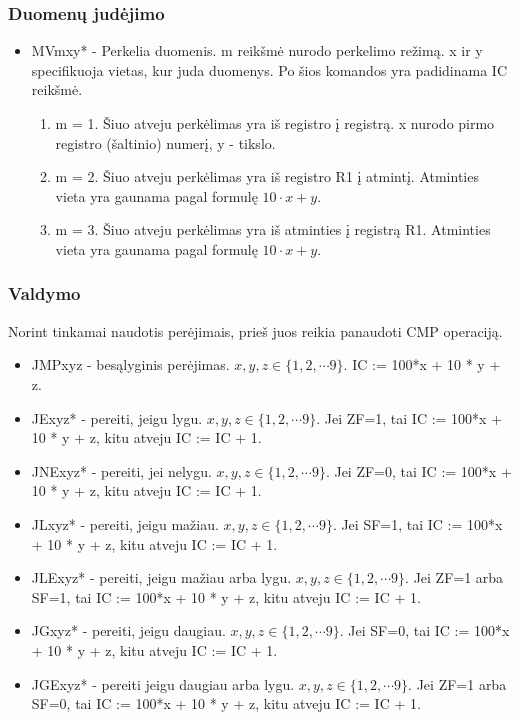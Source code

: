 \documentclass{VUMIFInfKursinis}
\begin{document}
\subsubsection{Duomenų judėjimo}
\begin{itemize}
	\item MVmxy* - Perkelia duomenis. m reikšmė nurodo perkelimo režimą. x ir y specifikuoja vietas, kur juda duomenys. Po šios komandos yra padidinama IC reikšmė.
	\begin{enumerate}
		\item m = 1. Šiuo atveju perkėlimas yra iš registro į registrą. x nurodo pirmo registro (šaltinio) numerį, y - tikslo.
		\item m = 2. Šiuo atveju perkėlimas yra iš registro R1 į atmintį. Atminties vieta yra gaunama pagal formulę $10 \cdot x + y$.
		\item m = 3. Šiuo atveju perkėlimas yra iš atminties į registrą R1. Atminties vieta yra gaunama pagal formulę $10 \cdot x + y$.
	\end{enumerate}
\end{itemize}

\subsubsection{Valdymo}
Norint tinkamai naudotis perėjimais, prieš juos reikia panaudoti CMP operaciją. 
\begin{itemize}
	\item JMPxyz - besąlyginis perėjimas. $x, y, z \in \{1, 2, \cdots 9 \}$. IC := 100*x + 10 * y + z.
	\item JExyz* - pereiti, jeigu lygu. $x, y, z \in \{1, 2, \cdots 9 \}$. Jei ZF=1, tai IC := 100*x + 10 * y + z, kitu atveju IC := IC + 1.
	\item JNExyz* - pereiti, jei nelygu. $x, y, z \in \{1, 2, \cdots 9 \}$. Jei ZF=0, tai IC := 100*x + 10 * y + z, kitu atveju IC := IC + 1.
	\item JLxyz* - pereiti, jeigu mažiau. $x, y, z \in \{1, 2, \cdots 9 \}$. Jei SF=1, tai IC := 100*x + 10 * y + z, kitu atveju IC := IC + 1.
	\item JLExyz* - pereiti, jeigu mažiau arba lygu. $x, y, z \in \{1, 2, \cdots 9 \}$. Jei ZF=1 arba SF=1, tai IC := 100*x + 10 * y + z, kitu atveju IC := IC + 1.
	\item JGxyz* - pereiti, jeigu daugiau. $x, y, z \in \{1, 2, \cdots 9 \}$. Jei SF=0, tai IC := 100*x + 10 * y + z, kitu atveju IC := IC + 1.
	\item JGExyz* - pereiti jeigu daugiau arba lygu. $x, y, z \in \{1, 2, \cdots 9 \}$. Jei ZF=1 arba SF=0, tai IC := 100*x + 10 * y + z, kitu atveju IC := IC + 1.
\end{itemize}
\end{document}
